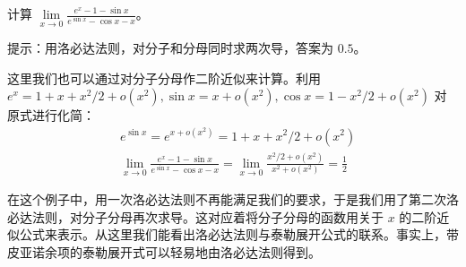 \begin{exercise}{}
计算 $\lim\limits_{x\rightarrow 0}\frac{e^x-1-\sin x}{e^{\sin x} - \cos x - x}$。
\end{exercise}
提示：用洛必达法则，对分子和分母同时求两次导，答案为 $0.5$。

这里我们也可以通过对分子分母作二阶近似来计算。利用 $e^x=1+x+x^2/2+o(x^2),\sin x=x+o(x^2),\cos x=1-x^2/2+o(x^2)$ 对原式进行化简：
\begin{equation}
\begin{aligned}
&e^{\sin x}=e^{x+o(x^2)}=1+x+x^2/2+o(x^2)\\
&\lim\limits_{x\rightarrow 0}\frac{e^x-1-\sin x}{e^{\sin x} - \cos x - x}=\lim\limits_{x\rightarrow 0}\frac{x^2/2+o(x^2)}{x^2+o(x^2)}=\frac{1}{2}
\end{aligned}
\end{equation}

在这个例子中，用一次洛必达法则不再能满足我们的要求，于是我们用了第二次洛必达法则，对分子分母再次求导。这对应着将分子分母的函数用关于 $x$ 的二阶近似公式来表示。从这里我们能看出洛必达法则与泰勒展开公式的联系。事实上，带皮亚诺余项的泰勒展开式可以轻易地由洛必达法则得到。